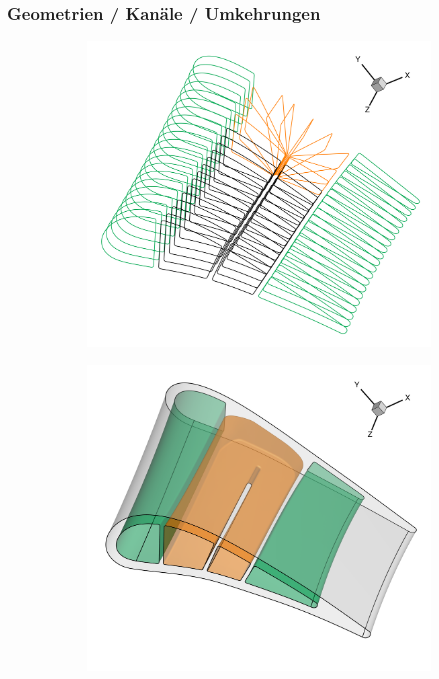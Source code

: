 \documentclass[8pt, aspectratio=169]{beamer}
\begin{document}
\begin{frame}
	\frametitle{Geometrien / Kanäle / Umkehrungen}
	\vspace{-0.5cm}\hspace{-0.5cm}
	\centering
	\begin{minipage}[t]{\textwidth}
		\begin{figure}[H]
			\centering
			\begin{subfigure}{.49\textwidth}
				\includegraphics[width=\textwidth]{../../tec/channel/13.png}
			\end{subfigure}
			\begin{subfigure}{.49\textwidth}
				\includegraphics[width=\textwidth]{../../tec/channel/14.png}
			\end{subfigure}
		\end{figure}
	\end{minipage}
	\vfill
\end{frame}
\end{document}
